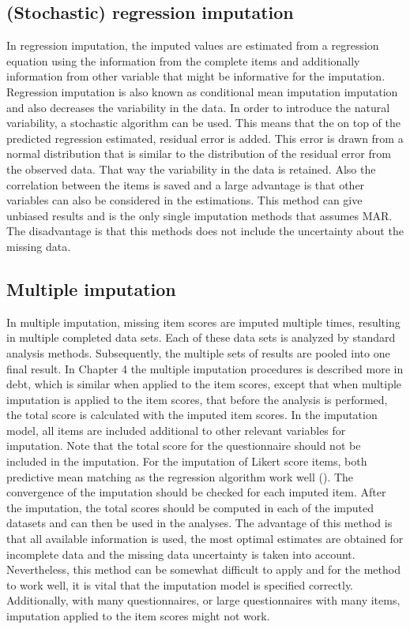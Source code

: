 \documentclass[
]{book}
\begin{document}
\hypertarget{stochastic-regression-imputation-1}{%
\subsection{(Stochastic) regression imputation}\label{stochastic-regression-imputation-1}}

In regression imputation, the imputed values are estimated from a regression equation using the information from the complete items and additionally information from other variable that might be informative for the imputation. Regression imputation is also known as conditional mean imputation imputation and also decreases the variability in the data. In order to introduce the natural variability, a stochastic algorithm can be used. This means that the on top of the predicted regression estimated, residual error is added. This error is drawn from a normal distribution that is similar to the distribution of the residual error from the observed data. That way the variability in the data is retained. Also the correlation between the items is saved and a large advantage is that other variables can also be considered in the estimations. This method can give unbiased results and is the only single imputation methods that assumes MAR. The disadvantage is that this methods does not include the uncertainty about the missing data.

\hypertarget{multiple-imputation-1}{%
\subsection{Multiple imputation}\label{multiple-imputation-1}}

In multiple imputation, missing item scores are imputed multiple times, resulting in multiple completed data sets. Each of these data sets is analyzed by standard analysis methods. Subsequently, the multiple sets of results are pooled into one final result. In Chapter 4 the multiple imputation procedures is described more in debt, which is similar when applied to the item scores, except that when multiple imputation is applied to the item scores, that before the analysis is performed, the total score is calculated with the imputed item scores. In the imputation model, all items are included additional to other relevant variables for imputation. Note that the total score for the questionnaire should not be included in the imputation. For the imputation of Likert score items, both predictive mean matching as the regression algorithm work well (\citet{Eekhout2014}). The convergence of the imputation should be checked for each imputed item. After the imputation, the total scores should be computed in each of the imputed datasets and can then be used in the analyses. The advantage of this method is that all available information is used, the most optimal estimates are obtained for incomplete data and the missing data uncertainty is taken into account. Nevertheless, this method can be somewhat difficult to apply and for the method to work well, it is vital that the imputation model is specified correctly. Additionally, with many questionnaires, or large questionnaires with many items, imputation applied to the item scores might not work.
\end{document}
